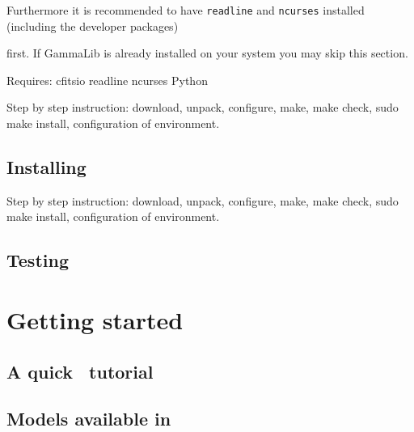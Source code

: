 \documentclass{article}[12pt,a4]
\begin{document}
Furthermore it is recommended to have {\tt readline} and {\tt ncurses} installed (including the
developer packages)


first.
If GammaLib is already installed on your system you may skip this section.

Requires:
cfitsio
readline
ncurses
Python

Step by step instruction:
download,
unpack,
configure,
make,
make check,
sudo make install,
configuration of environment.


\subsection{Installing \this}
\label{sec:ctatools}

Step by step instruction:
download,
unpack,
configure,
make,
make check,
sudo make install,
configuration of environment.


\subsection{Testing \this}


%
\section{Getting started}

\subsection{A quick \this\ tutorial}

\subsection{Models available in \this}
\end{document}
